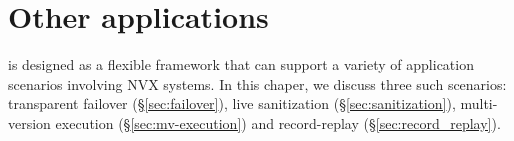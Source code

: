 \chapter{Other applications}
\label{chap:applications}

\varan is designed as a flexible framework that can support a variety
of application scenarios involving NVX systems.  In this chaper, we
discuss three such scenarios: transparent failover
(\S\ref{sec:failover}), live sanitization (\S\ref{sec:sanitization}),
multi-version execution (\S\ref{sec:mv-execution}) and record-replay
(\S\ref{sec:record_replay}).







